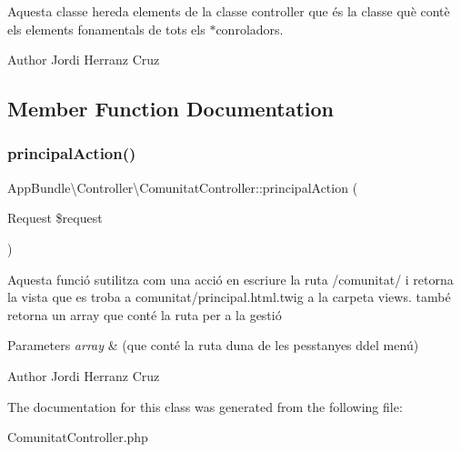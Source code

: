 Aquesta classe hereda elements de la classe controller que és la classe què contè els elements fonamentals de tots els $\ast$conroladors.

\begin{DoxyAuthor}{Author}
Jordi Herranz Cruz 
\end{DoxyAuthor}


\subsection{Member Function Documentation}
\mbox{\label{class_app_bundle_1_1_controller_1_1_comunitat_controller_a54cf6158ce22df4010684dd37f98d70c}} 
\subsubsection{\texorpdfstring{principal\+Action()}{principalAction()}}
{\footnotesize\ttfamily App\+Bundle\textbackslash{}\+Controller\textbackslash{}\+Comunitat\+Controller\+::principal\+Action (\begin{DoxyParamCaption}\item[{Request}]{\$request }\end{DoxyParamCaption})}

Aquesta funció s\textquotesingle{}utilitza com una acció en escriure la ruta /comunitat/ i retorna la vista que es troba a comunitat/principal.\+html.\+twig a la carpeta views. també retorna un array que conté la ruta per a la gestió


\begin{DoxyParams}{Parameters}
{\em array} & (que conté la ruta d\textquotesingle{}una de les pesstanyes ddel menú)\\
\hline
\end{DoxyParams}
\begin{DoxyAuthor}{Author}
Jordi Herranz Cruz 
\end{DoxyAuthor}


The documentation for this class was generated from the following file\+:\begin{DoxyCompactItemize}
\item 
Comunitat\+Controller.\+php\end{DoxyCompactItemize}
